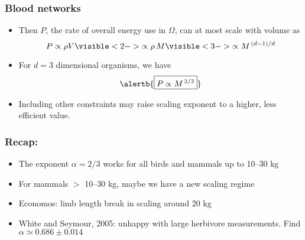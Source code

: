 \begin{frame}
  \frametitle{Blood networks}

  \begin{itemize}
  \item<1-> Then $P$, the rate of overall energy 
    use in $\Omega$, can at most scale with volume as
    $$
    P \propto \rho V 
    \visible<2->{
      \propto \rho \, M
    }
    \visible<3->{
      \propto M^{\, (d-1)/d}
    }
    $$
  \item<4-> 
    For $d=3$ dimensional organisms, we have 
    $$\alertb{\boxed{ P \propto M^{\, 2/3}}}$$
  \item<5-> 
    Including other constraints may raise scaling exponent
    to a higher, less efficient value.
  \end{itemize}    

\end{frame}

\begin{frame}
  \frametitle{Recap:}

  \begin{itemize}
  \item<1-> 
    The exponent $\alpha = 2/3$ works for all birds and
    mammals up to 10--30 kg
  \item<2-> For mammals $>$ 10--30 kg, maybe we have a new scaling regime
  \item<3-> Economos: limb length break in scaling around 20 kg
  \item<4-> White and Seymour, 2005: unhappy with large herbivore measurements.
Find $\alpha \simeq 0.686 \pm 0.014$
  \end{itemize}

\end{frame}


